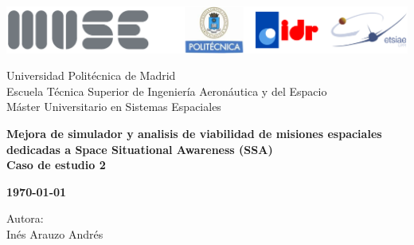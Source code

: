 \documentclass{article}
\numberwithin{equation}{section}
\numberwithin{equation}{subsection}
\begin{document}
\begin{center}
    \thispagestyle{empty}

    \includegraphics[width=16.5cm]{Images Document/Logo_portada.png} \\

    \vspace{1cm}

    \Large{Universidad Politécnica de Madrid \\
        \vspace{0.35cm}
        Escuela Técnica Superior de Ingeniería Aeronáutica y del Espacio \\
        \vspace{0.35cm}
        Máster Universitario en Sistemas Espaciales \\}

    \begin{center}
        \vspace{2 cm}
        {\bfseries\Huge Mejora de simulador y analisis de viabilidad de misiones espaciales dedicadas a Space Situational Awareness (SSA) \\}
        \vspace{1 cm}
        \textbf{Caso de estudio 2 \\}
        \vspace{0.5cm}

        {\large{\textbf{\today}}}

        \vfill
        {\Large Autora: \\
            Inés Arauzo Andrés \\
        }


    \end{center}
\end{center}

\thispagestyle{empty}

\newpage
{} %


\tableofcontents


\setlength{\parskip}{4mm}
\setlength{\parindent}{20pt}
\setlength{\headheight}{16.07225pt}

\newpage
{}



\newpage

\newpage

\newpage



\newpage
\clearpage

\printbibliography[title = {Documentos Aplicables}]
\newpage
\clearpage

% 
\end{document}
